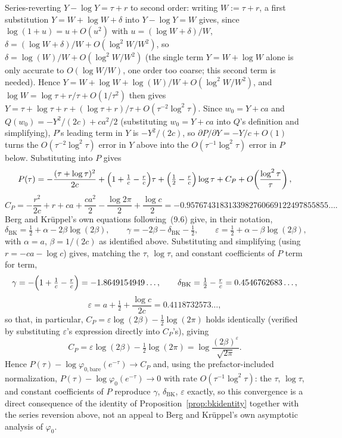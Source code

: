 \documentclass[11pt]{article}
\theoremstyle{definition}
\theoremstyle{remark}
\begin{document}
Series-reverting $Y-\log Y=\tau+r$ to second order: writing $W:=\tau+r$, a first substitution
$Y=W+\log W+\delta$ into $Y-\log Y=W$ gives, since $\log(1+u)=u+O(u^2)$ with $u=(\log W+\delta)/W$,
$\delta = (\log W+\delta)/W + O(\log^2W/W^2)$, so $\delta=\log(W)/W+O(\log^2W/W^2)$ (the single
term $Y=W+\log W$ alone is only accurate to $O(\log W/W)$, one order too coarse; this second term
is needed). Hence $Y=W+\log W+\log(W)/W+O(\log^2W/W^2)$, and $\log W=\log\tau+r/\tau+O(1/\tau^2)$
then gives $Y = \tau + \log\tau + r + (\log\tau+r)/\tau + O(\tau^{-2}\log^2\tau)$. Since $w_0=Y+ca$
and
$Q(w_0)=-Y^2/(2c)+ca^2/2$ (substituting $w_0=Y+ca$ into $Q$'s definition and simplifying), $P$'s
leading term in $Y$ is $-Y^2/(2c)$, so $\partial P/\partial Y=-Y/c+O(1)$ turns the
$O(\tau^{-2}\log^2\tau)$ error in $Y$ above into the $O(\tau^{-1}\log^2\tau)$ error in $P$ below.
Substituting into $P$ gives
\[
P(\tau) = -\frac{(\tau+\log\tau)^2}{2c} + \Bigl(1+\tfrac1c-\tfrac{r}{c}\Bigr)\tau +
\Bigl(\tfrac12-\tfrac{r}{c}\Bigr)\log\tau + C_P + O\!\left(\frac{\log^2\tau}{\tau}\right),
\]
\[
C_P = -\frac{r^2}{2c}+r+ca+\frac{ca^2}{2}-\frac{\log2\pi}{2}+\frac{\log c}{2} =
-0.9576743183133982760669122497855855\ldots.
\]
Berg and Kr\"uppel's own equations following~(9.6) give, in their notation,
\[
\delta_{\mathrm{BK}} = \tfrac12+\alpha-2\beta\log(2\beta), \qquad
\gamma = -2\beta-\delta_{\mathrm{BK}}-\tfrac12, \qquad
\varepsilon = \tfrac12+\alpha-\beta\log(2\beta),
\]
with $\alpha=a$, $\beta=1/(2c)$ as identified above. Substituting and simplifying (using
$r=-ca-\log c$) gives, matching the $\tau$, $\log\tau$, and constant coefficients of $P$
term for term,
\[
\gamma = -\Bigl(1+\tfrac1c-\tfrac rc\Bigr) = -1.8649154949\ldots, \qquad
\delta_{\mathrm{BK}} = \tfrac12-\tfrac rc = 0.4546762683\ldots,
\]
\[
\varepsilon = a+\tfrac12+\frac{\log c}{2c} = 0.4118732573\ldots,
\]
so that, in particular, $C_P=\varepsilon\log(2\beta)-\tfrac12\log(2\pi)$ holds identically (verified
by substituting $\varepsilon$'s expression directly into $C_P$'s), giving
\[
C_P = \varepsilon\log(2\beta) - \tfrac12\log(2\pi) = \log\frac{(2\beta)^\varepsilon}{\sqrt{2\pi}}.
\]
Hence $P(\tau) - \log\varphi_{0,\mathrm{bare}}(e^{-\tau}) \to C_P$ and, using the prefactor-included
normalization, $P(\tau) - \log\varphi_0(e^{-\tau}) \to 0$ with rate $O(\tau^{-1}\log^2\tau)$: the
$\tau$, $\log\tau$, and constant coefficients of $P$ reproduce $\gamma$, $\delta_{\mathrm{BK}}$,
$\varepsilon$ exactly, so this convergence is a direct consequence of the identity of
Proposition~\ref{prop:bkidentity} together with the series reversion above, not an appeal to Berg
and Kr\"uppel's own asymptotic analysis of $\varphi_0$.
\end{document}
